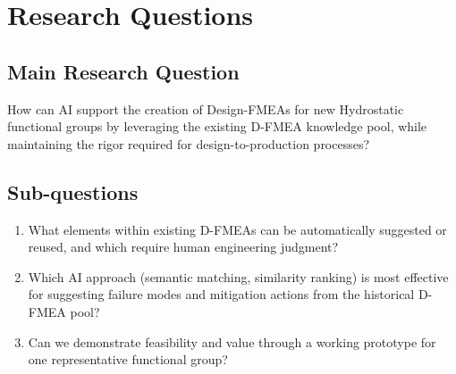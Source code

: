 
\section{Research Questions}

\subsection*{Main Research Question}

How can AI support the creation of Design-FMEAs for new Hydrostatic functional groups by leveraging the existing D-FMEA knowledge pool, while maintaining the rigor required for design-to-production processes?

\subsection*{Sub-questions}

\begin{enumerate}
    \item What elements within existing D-FMEAs can be automatically suggested or reused, and which require human engineering judgment?
    
    \item Which AI approach (semantic matching, similarity ranking) is most effective for suggesting failure modes and mitigation actions from the historical D-FMEA pool?
    
    \item Can we demonstrate feasibility and value through a working prototype for one representative functional group?
    
\end{enumerate}
